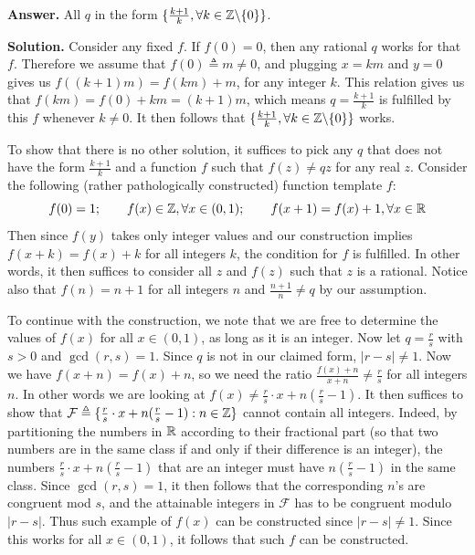 \documentclass[11pt,a4paper]{article}
\begin{document}
\begin{enumerate}
		\textbf{Answer.}
		All $q$ in the form $\{\frac{k+1}{k}, \forall k\in{\mathbb Z}\backslash \{0\}\}$. 
		
		\textbf{Solution.}
		Consider any fixed $f$. If $f(0)=0$, then any rational $q$ works for that $f$. 
		Therefore we assume that $f(0)\triangleq m \neq 0$, 
		and plugging $x=km$ and $y=0$ gives us $f((k + 1)m) = f(km) + m$, for any integer $k$. 
		This relation gives us that $f(km) = f(0) + km = (k + 1)m$, 
		which means $q = \frac{k + 1}{k}$ is fulfilled by this $f$ whenever $k\neq 0$. 
		It then follows that $\{\frac{k+1}{k}, \forall k\in{\mathbb Z}\backslash \{0\}\}$ works. 
		
		To show that there is no other solution, 
		it suffices to pick any $q$ that does not have the form $\frac{k+1}{k}$ 
		and a function $f$ such that $f(z)\neq qz$ for any real $z$. 
		Consider the following (rather pathologically constructed) function template $f$: 
		\[
		f(0) = 1;\qquad  f(x)\in {\mathbb Z}, \forall x\in (0, 1); \qquad 
		f(x + 1) = f(x) + 1, \forall x\in{\mathbb R}
		\]
		Then since $f(y)$ takes only integer values and our construction implies $f(x + k)=f(x) + k$ for all integers $k$, 
		the condition for $f$ is fulfilled. 
		In other words, it then suffices to consider all $z$ and $f(z)$ such that $z$ is a rational. 
		Notice also that $f(n) = n + 1$ for all integers $n$ and $\frac{n+1}{n}\neq q$ by our assumption. 
		
		To continue with the construction, we note that we are free to determine the values of $f(x)$ for all $x\in (0, 1)$, 
		as long as it is an integer. Now let $q=\frac{r}{s}$ with $s > 0$ and $\gcd(r, s)=1$. 
		Since $q$ is not in our claimed form, $|r - s|\neq 1$. 
		Now we have $f(x + n) = f(x) + n$, so we need the ratio $\frac{f(x) + n}{x + n}\neq \frac{r}{s}$ 
		for all integers $n$. 
		In other words we are looking at $f(x)\neq \frac{r}{s}\cdot x + n(\frac{r}{s} - 1)$. 
		It then suffices to show that $\mathcal{F}\triangleq \{\frac{r}{s}\cdot x + n(\frac{r}{s} - 1): n\in{\mathbb Z}\}$ cannot contain all integers. 
		Indeed, by partitioning the numbers in ${\mathbb R}$ according to their fractional part 
		(so that two numbers are in the same class if and only if their difference is an integer), 
		the numbers $\frac{r}{s}\cdot x + n(\frac{r}{s} - 1)$ that are an integer must have 
		$n(\frac{r}{s} - 1)$ in the same class. 
		Since $\gcd(r, s) = 1$, it then follows that the corresponding $n$'s are congruent mod $s$, 
		and the attainable integers in $\mathcal{F}$ has to be congruent modulo $|r - s|$. 
		Thus such example of $f(x)$ can be constructed since $|r-s|\neq 1$. 
		Since this works for all $x\in (0, 1)$, it follows that such $f$ can be constructed. 
		
	\end{enumerate}
    
\end{document}
